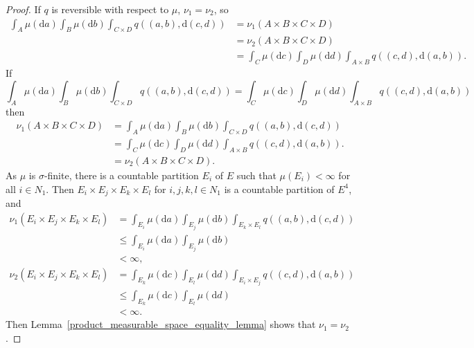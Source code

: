\documentclass[english,twoside,openright]{HYgraduMLDS}
\newcommand{\dx}{\mathrm{d}}
\begin{document}
\begin{proof}
	If \(q\) is reversible with respect to \(\mu\), \(\nu_{1} = \nu_{2}\), so
  \begin{align*}
    \int_{A}\mu(\dx a)\int_{B}\mu(\dx b)\int_{C\times D}q((a, b), \dx(c, d))
    &= \nu_{1}(A\times B\times C\times D)
    \\&= \nu_{2}(A\times B\times C\times D)
    \\&= \int_{C}\mu(\dx c)\int_{D}\mu(\dx d)\int_{A\times B}q((c, d), \dx(a, b)).
  \end{align*}
  If
  \[
    \int_{A}\mu(\dx a)\int_{B}\mu(\dx b)\int_{C\times D}q((a, b), \dx(c, d))
    = \int_{C}\mu(\dx c)\int_{D}\mu(\dx d)\int_{A\times B}q((c, d), \dx(a, b))
  \]
  then
  \begin{align*}
    \nu_{1}(A\times B\times C\times D)
    &= \int_{A}\mu(\dx a)\int_{B}\mu(\dx b)\int_{C\times D}q((a, b), \dx(c, d))
    \\&= \int_{C}\mu(\dx c)\int_{D}\mu(\dx d)\int_{A\times B}q((c, d), \dx(a, b)).
    \\&= \nu_{2}(A\times B\times C\times D).
  \end{align*}
  As \(\mu\) is \(\sigma\)-finite, there is a countable partition \(E_{i}\) of \(E\)
  such that \(\mu(E_{i}) < \infty\) for all \(i\in N_{1}\). Then
  \(E_{i}\times E_{j}\times E_{k}\times E_{l}\) for \(i, j, k, l\in N_{1}\) is a
  countable partition of \(E^{4}\), and
  \begin{align*}
    \nu_{1}(E_{i}\times E_{j}\times E_{k}\times E_{l})
    &= \int_{E_{i}}\mu(\dx a)\int_{E_{j}}\mu(\dx b)\int_{E_{k}\times E_{l}}q((a, b), \dx(c,d))
    \\&\leq \int_{E_{i}}\mu(\dx a)\int_{E_{j}}\mu(\dx b)
    \\&< \infty,
  \end{align*}
  \begin{align*}
    \nu_{2}(E_{i}\times E_{j}\times E_{k}\times E_{l})
    &= \int_{E_{k}}\mu(\dx c)\int_{E_{l}}\mu(\dx d)\int_{E_{i}\times E_{j}}q((c, d), \dx(a,b))
    \\&\leq \int_{E_{k}}\mu(\dx c)\int_{E_{l}}\mu(\dx d)
    \\&< \infty.
  \end{align*}
  Then Lemma~\ref{product_measurable_space_equality_lemma} shows that
  \(\nu_{1} = \nu_{2}\).
\end{proof}
\end{document}
